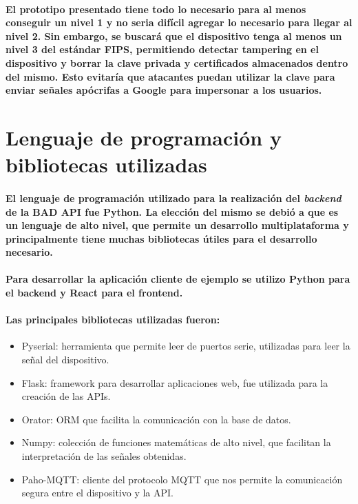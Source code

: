 \documentclass{article}
\begin{document}
\paragraph{
El prototipo presentado tiene todo lo necesario para al menos conseguir un nivel 1 y no seria difícil agregar lo necesario para llegar al nivel 2. Sin embargo, se buscará que el dispositivo tenga al menos un nivel 3 del estándar FIPS, permitiendo detectar tampering en el dispositivo y borrar la clave privada y certificados almacenados dentro del mismo. Esto evitaría que atacantes puedan utilizar la clave para enviar señales apócrifas a Google para impersonar a los usuarios.
}

\section{Lenguaje de programación y bibliotecas utilizadas}
\paragraph{
El lenguaje de programación utilizado para la realización del \textit{backend} de la BAD API fue Python. La elección del mismo se debió a que es un lenguaje de alto nivel, que permite un desarrollo multiplataforma y principalmente tiene muchas bibliotecas útiles para el desarrollo necesario.
}
\paragraph{
Para desarrollar la aplicación cliente de ejemplo se utilizo Python para el backend y React para el frontend.
}
\paragraph{
Las principales bibliotecas utilizadas fueron:
}
\begin{itemize}
    \item Pyserial: herramienta que permite leer de puertos serie, utilizadas para leer la señal del dispositivo.
    \item Flask: framework para desarrollar aplicaciones web, fue utilizada para la creación de las APIs.
    \item Orator: ORM que facilita la comunicación con la base de datos.
    \item Numpy: colección de funciones matemáticas de alto nivel, que facilitan la interpretación de las señales obtenidas.
    \item Paho-MQTT: cliente del protocolo MQTT que nos permite la comunicación segura entre el dispositivo y la API.
\end{itemize}
\end{document}
